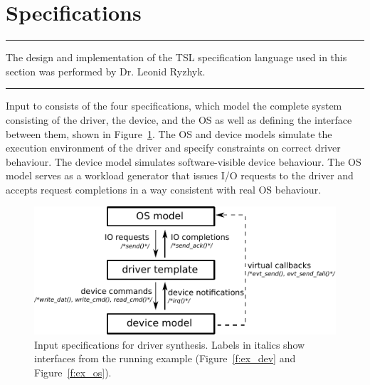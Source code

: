        
%
%        
%        

\section{Specifications}
\label{s:specifications}

\hrule
\vspace{10pt}
\begin{center}
The design and implementation of the TSL specification language used in this section was performed by Dr. Leonid Ryzhyk. 
\end{center}
\hrule
\vspace{20pt}

Input to \termite consists of the four specifications, which model the complete system consisting of the driver, the device, and the OS as well as defining the interface between them, shown in Figure~\ref{f:actions}.  The OS and device models simulate the execution environment of the driver and specify constraints on correct driver behaviour.  The device model simulates software-visible device behaviour.  The OS model serves as a workload generator that issues I/O requests to the driver and accepts request completions in a way consistent with real OS behaviour.

\begin{figure}
    \center
    \includegraphics[width=0.85\linewidth]{imgs/actions.pdf}
    \caption{Input specifications for driver synthesis.  
    Labels in italics show interfaces from the running example
(Figure~\ref{f:ex_dev} and Figure~\ref{f:ex_os}).}\label{f:actions}
\end{figure}

